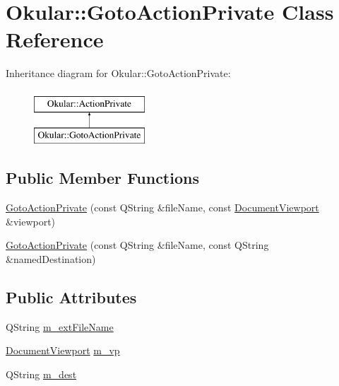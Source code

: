 \hypertarget{classOkular_1_1GotoActionPrivate}{\section{Okular\+:\+:Goto\+Action\+Private Class Reference}
\label{classOkular_1_1GotoActionPrivate}
}
Inheritance diagram for Okular\+:\+:Goto\+Action\+Private\+:\begin{figure}[H]
\begin{center}
\leavevmode
\includegraphics[height=2.000000cm]{classOkular_1_1GotoActionPrivate}
\end{center}
\end{figure}
\subsection*{Public Member Functions}
\begin{DoxyCompactItemize}
\item 
\hyperlink{classOkular_1_1GotoActionPrivate_ab7008ce862114d769f118f2d7be9957c}{Goto\+Action\+Private} (const Q\+String \&file\+Name, const \hyperlink{classOkular_1_1DocumentViewport}{Document\+Viewport} \&viewport)
\item 
\hyperlink{classOkular_1_1GotoActionPrivate_aa02585994f25d92be835c5cb0029b0eb}{Goto\+Action\+Private} (const Q\+String \&file\+Name, const Q\+String \&named\+Destination)
\end{DoxyCompactItemize}
\subsection*{Public Attributes}
\begin{DoxyCompactItemize}
\item 
Q\+String \hyperlink{classOkular_1_1GotoActionPrivate_acdb8f2ef61dcff5ceb88cbde7a1e806e}{m\+\_\+ext\+File\+Name}
\item 
\hyperlink{classOkular_1_1DocumentViewport}{Document\+Viewport} \hyperlink{classOkular_1_1GotoActionPrivate_a6277974042170f5495e316d07117c1c5}{m\+\_\+vp}
\item 
Q\+String \hyperlink{classOkular_1_1GotoActionPrivate_a48016ac441818d2bcda8d08a2b390867}{m\+\_\+dest}
\end{DoxyCompactItemize}


